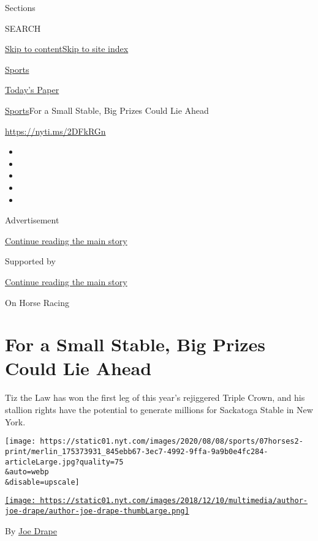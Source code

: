 Sections

SEARCH

\protect\hyperlink{site-content}{Skip to
content}\protect\hyperlink{site-index}{Skip to site index}

\href{https://www.nytimes.com/section/sports}{Sports}

\href{https://myaccount.nytimes.com/auth/login?response_type=cookie\&client_id=vi}{}

\href{https://www.nytimes.com/section/todayspaper}{Today's Paper}

\href{/section/sports}{Sports}\textbar{}For a Small Stable, Big Prizes
Could Lie Ahead

\href{https://nyti.ms/2DFkRGn}{https://nyti.ms/2DFkRGn}

\begin{itemize}
\item
\item
\item
\item
\item
\end{itemize}

Advertisement

\protect\hyperlink{after-top}{Continue reading the main story}

Supported by

\protect\hyperlink{after-sponsor}{Continue reading the main story}

On Horse Racing

\hypertarget{for-a-small-stable-big-prizes-could-lie-ahead}{%
\section{For a Small Stable, Big Prizes Could Lie
Ahead}\label{for-a-small-stable-big-prizes-could-lie-ahead}}

Tiz the Law has won the first leg of this year's rejiggered Triple
Crown, and his stallion rights have the potential to generate millions
for Sackatoga Stable in New York.

\texttt{[image: https://static01.nyt.com/images/2020/08/08/sports/07horses2-print/merlin\_175373931\_845ebb67-3ec7-4992-9ffa-9a9b0e4fc284-articleLarge.jpg?quality=75\\\&auto=webp\\\&disable=upscale]}

\href{https://www.nytimes.com/by/joe-drape}{\texttt{[image: https://static01.nyt.com/images/2018/12/10/multimedia/author-joe-drape/author-joe-drape-thumbLarge.png]}}

By \href{https://www.nytimes.com/by/joe-drape}{Joe Drape}

